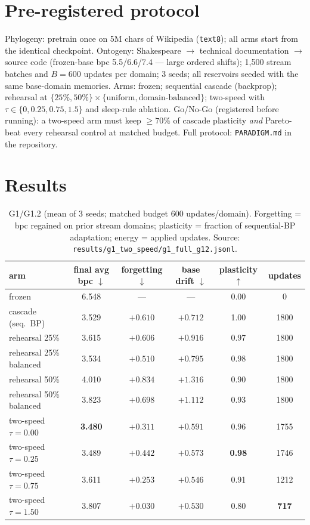 \documentclass[11pt]{article}
\begin{document}
\section{Pre-registered protocol}\label{sec:protocol}
Phylogeny: pretrain once on 5M chars of Wikipedia (\texttt{text8}); all arms start from the
identical checkpoint. Ontogeny: Shakespeare $\rightarrow$ technical documentation
$\rightarrow$ source code (frozen-base bpc 5.5/6.6/7.4 --- large ordered shifts); 1{,}500
stream batches and $B{=}600$ updates per domain; 3 seeds; all reservoirs seeded with the same
base-domain memories. Arms: frozen; sequential cascade (backprop); rehearsal at
$\{25\%,50\%\}\times\{\text{uniform},\text{domain-balanced}\}$; two-speed with
$\tau\in\{0,0.25,0.75,1.5\}$ and sleep-rule ablation. Go/No-Go (registered before running):
a two-speed arm must keep $\ge70\%$ of cascade plasticity \emph{and} Pareto-beat every
rehearsal control at matched budget. Full protocol: \texttt{PARADIGM.md} in the repository.

\section{Results}\label{sec:results}

\begin{table}[t]
\centering\small
\caption{G1/G1.2 (mean of 3 seeds; matched budget 600 updates/domain). Forgetting = bpc
regained on prior stream domains; plasticity = fraction of sequential-BP adaptation; energy =
applied updates. Source: \texttt{results/g1\_two\_speed/g1\_full\_g12.jsonl}.}
\label{tab:main}
\begin{tabular}{lccccc}
\toprule
arm & final avg bpc $\downarrow$ & forgetting $\downarrow$ & base drift $\downarrow$ &
plasticity $\uparrow$ & updates \\
\midrule
frozen                    & 6.548 & ---     & ---     & 0.00 & 0 \\
cascade (seq.\ BP)        & 3.529 & $+0.610$ & $+0.712$ & 1.00 & 1800 \\
rehearsal 25\%            & 3.615 & $+0.606$ & $+0.916$ & 0.97 & 1800 \\
rehearsal 25\% balanced   & 3.534 & $+0.510$ & $+0.795$ & 0.98 & 1800 \\
rehearsal 50\%            & 4.010 & $+0.834$ & $+1.316$ & 0.90 & 1800 \\
rehearsal 50\% balanced   & 3.823 & $+0.698$ & $+1.112$ & 0.93 & 1800 \\
\midrule
two-speed $\tau{=}0.00$   & \textbf{3.480} & $+0.311$ & $+0.591$ & 0.96 & 1755 \\
two-speed $\tau{=}0.25$   & 3.489 & $+0.442$ & $+0.573$ & \textbf{0.98} & 1746 \\
two-speed $\tau{=}0.75$   & 3.611 & $+0.253$ & $+0.546$ & 0.91 & 1212 \\
two-speed $\tau{=}1.50$   & 3.807 & $\mathbf{+0.030}$ & $+0.530$ & 0.80 & \textbf{717} \\
\bottomrule
\end{tabular}
\end{table}
\end{document}
